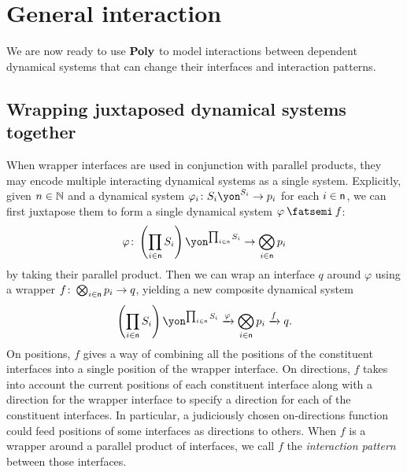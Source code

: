 \documentclass[Book-Poly]{subfiles}
\begin{document}

\section{General interaction}\label{sec.poly.dyn_sys.interact}

We are now ready to use $\mathbf{Poly}$ to model interactions between dependent dynamical systems that can change their interfaces and interaction patterns.

\subsection{Wrapping juxtaposed dynamical systems together}

When wrapper interfaces are used in conjunction with parallel products, they may encode multiple interacting dynamical systems as a single system.
Explicitly, given $n\in\mathbb{N}$ and a dynamical system $\varphi_i\colon S_i\yon^{S_i}\to p_i$ for each $i\in\mathsf{n}$, we can first juxtapose them to form a single dynamical system $\varphi\then f$:
\[\varphi\colon \left(\prod_{i\in\ord{n}}S_i\right)\yon^{\prod_{i\in\ord{n}}S_i}\to\bigotimes_{i\in\ord{n}}p_i\]
by taking their parallel product.
Then we can wrap an interface $q$ around $\varphi$ using a wrapper $f\colon\bigotimes_{i\in\mathsf{n}}p_i\to q$, yielding a new composite dynamical system
\[\left(\prod_{i\in\ord{n}}S_i\right)\yon^{\prod_{i\in\ord{n}}S_i}\To{\varphi}\bigotimes_{i\in\ord{n}}p_i\To{f}q.\]
On positions, $f$ gives a way of combining all the positions of the constituent interfaces into a single position of the wrapper interface.
On directions, $f$ takes into account the current positions of each constituent interface along with a direction for the wrapper interface to specify a direction for each of the constituent interfaces.
In particular, a judiciously chosen on-directions function could feed positions of some interfaces as directions to others.
When $f$ is a wrapper around a parallel product of interfaces, we call $f$ the \emph{interaction pattern} between those interfaces.
\end{document}
